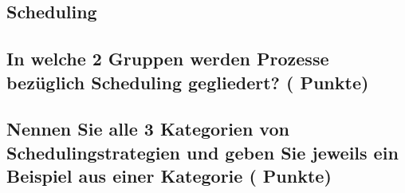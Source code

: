 \documentclass[9pt]{article}
\begin{document}
\begin{center}
  \begin{minipage}{0.9\linewidth}
    \section{Scheduling}
    \subsection{In welche 2 Gruppen werden Prozesse bezüglich Scheduling gegliedert? ( Punkte)}
    \vspace{10mm}
    \subsection{Nennen Sie alle 3 Kategorien von Schedulingstrategien und geben Sie jeweils ein Beispiel aus einer Kategorie ( Punkte)}
    
  \end{minipage}
\end{center}
\end{document}
